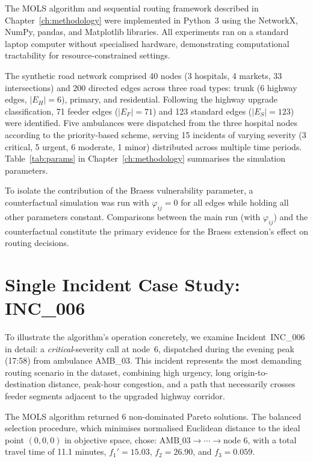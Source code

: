 \documentclass[paper=A4, 12pt, mathscr]{report}
\begin{document}
	The MOLS algorithm and sequential routing framework described in
	Chapter~\ref{ch:methodology} were implemented in Python~3 using the
	NetworkX, NumPy, pandas, and Matplotlib libraries. All experiments ran
	on a standard laptop computer without specialised hardware, demonstrating
	computational tractability for resource-constrained settings.
	
	The synthetic road network comprised 40 nodes (3 hospitals, 4 markets,
	33 intersections) and 200 directed edges across three road types: trunk
	(6 highway edges, $|E_H|=6$), primary, and residential. Following the
	highway upgrade classification, 71 feeder edges ($|E_F|=71$) and 123
	standard edges ($|E_S|=123$) were identified. Five ambulances were
	dispatched from the three hospital nodes according to the priority-based
	scheme, serving 15 incidents of varying severity (3 critical, 5 urgent,
	6 moderate, 1 minor) distributed across multiple time periods.
	Table~\ref{tab:params} in Chapter~\ref{ch:methodology} summarises the
	simulation parameters.
	
	To isolate the contribution of the Braess vulnerability parameter, a
	counterfactual simulation was run with $\varphi_{ij}=0$ for all edges
	while holding all other parameters constant. Comparisons between the
	main run (with $\varphi_{ij}$) and the counterfactual constitute the
	primary evidence for the Braess extension's effect on routing decisions.
	
	\section{Single Incident Case Study: INC\_006}
	
	To illustrate the algorithm's operation concretely, we examine
	Incident~INC\_006 in detail: a \textit{critical}-severity call at
	node~6, dispatched during the evening peak (17:58) from ambulance
	AMB\_03. This incident represents the most demanding routing scenario
	in the dataset, combining high urgency, long origin-to-destination
	distance, peak-hour congestion, and a path that necessarily crosses
	feeder segments adjacent to the upgraded highway corridor.
	
	The MOLS algorithm returned 6 non-dominated Pareto solutions. The
	balanced selection procedure, which minimises normalised Euclidean
	distance to the ideal point $(0,0,0)$ in objective space, chose:
	$\text{AMB\_03} \to \cdots \to \text{node~6}$, with a total travel time
	of 11.1 minutes, $f_1'=15.03$, $f_2=26.90$, and $f_3=0.059$.
	
\end{document}
